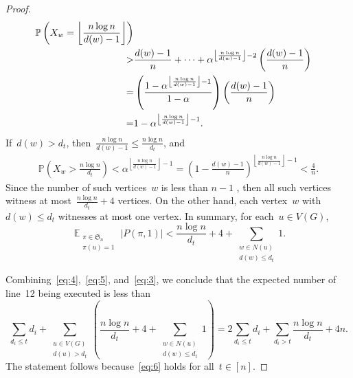 \documentclass[10pt,a4paper]{amsart}
\begin{document}
\begin{proof}
\begin{align}
    \mathbb{P}\left(X_{w}=\left\lfloor {\frac {n \log n}{d(w)-1}} \right\rfloor \right)
    \notag
    \\
    > & \frac{d(w)-1}{n} + \cdots + \alpha^{\left\lfloor {\frac {n \log n}{d(w)-1}} \right\rfloor - 2} \left(\frac{d(w)-1}{n}\right)
    \notag
    \\
    = & \left(\frac{1 - \alpha^{\left\lfloor {\frac {n \log n}{d(w)-1}} \right\rfloor - 1}}{1 - \alpha}\right) \left(\frac{d(w)-1}{n}\right)
    \notag
    \\
    = & {1 - \alpha^{\left\lfloor {\frac {n \log n}{d(w)-1}} \right\rfloor - 1}}.
    \notag
    \label{eq:2}
  \end{align}
  If~$d(w) > d_t$, then~$\frac {n\log n}{d(w)-1} \le \frac {n\log n}{d_t}$, and
  \begin{align}
    \mathbb{P}\left(X_{w}>\frac {n\log n}{d_t}\right)< \alpha^{\left\lfloor {\frac {n \log n}{d(w)-1}} \right\rfloor - 1} =  \left(1-\frac {d(w)-1}{n}\right)^{\left\lfloor {\frac {n \log n}{d(w)-1}} \right\rfloor - 1} < \frac{4}{n}.
  \end{align}
  Since the number of such vertices~$w$ is less than $n-1$ , then all such vertices witness at most~$\frac {n\log n}{d_t} + 4$ vertices.
  On the other hand, each vertex~$w$ with~$d(w)\le d_t$ witnesses at most one vertex.
  In summary, for each~$u\in V(G)$,
  \begin{equation}
    \label{eq:3}
    \mathop{\mathbb{E}}_{\substack{\pi \in {\mathfrak {S}_{n}}\\ \pi(u) = 1}} |P(\pi, 1)| <
    \frac {n\log n}{d_t} + 4 +
    \sum_{\substack{{w\in N(u)}\\ {d(w)\le d_t}}}1.
  \end{equation}

  Combining~\eqref{eq:4},~\eqref{eq:5}, and~\eqref{eq:3}, we conclude that the expected number of line~12 being executed is less than
  \begin{equation}
    \label{eq:6}
    \sum_{d_i\le t} d_i + \sum_{\substack{u \in V(G)\\ d(u) > d_{t}}} \left(\frac {n\log n}{d_t} + 4 +
    \sum_{\substack{{w\in N(u)}\\ {d(w)\le d_t}}}1\right)
    = 2\sum_{d_i\le t} d_i + \sum_{d_i>t} \frac {n\log n}{d_t} + 4n.
  \end{equation}
  The statement follows because~\eqref{eq:6} holds for all~$t\in [n]$.
\end{proof}
\end{document}
